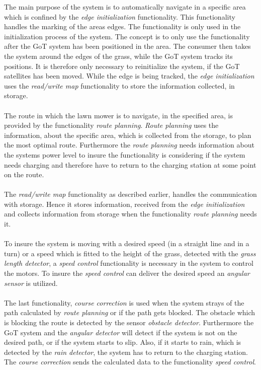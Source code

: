 \noindent
The main purpose of the system is to automatically navigate in a specific area which is confined by the \textit{edge initialization} functionality. This functionality handles the marking of the areas edges. The functionality is only used in the initialization process of the system. The concept is to only use the functionality after the GoT system has been positioned in the area. The consumer then takes the system around the edges of the grass, while the GoT system tracks its positions. It is therefore only necessary to reinitialize the system, if the GoT satellites has been moved. While the edge is being tracked, the \textit{edge initialization} uses the \textit{read/write map} functionality to store the information collected, in storage. \\\\ 
\noindent
The route in which the lawn mower is to navigate, in the specified area, is provided by the functionality \textit{route planning}. \textit{Route planning} uses the information, about the specific area, which is collected from the storage, to plan the most optimal route. Furthermore the \textit{route planning} needs information about the systems power level to insure the functionality is considering if the system needs charging and therefore have to return to the charging station at some point on the route.\\\\
\noindent
The \textit{read/write map} functionality as described earlier, handles the communication with storage. Hence it stores information, received from the \textit{edge initialization} and collects information from storage when the functionality \textit{route planning} needs it. \\\\
\noindent
To insure the system is moving with a desired speed (in a straight line and in a turn) or a speed which is fitted to the height of the grass, detected with the \textit{grass length detector}, a \textit{speed control} functionality is necessary in the system to control the motors. To insure the \textit{speed control} can deliver the desired speed an \textit{angular sensor} is utilized. \\\\
\noindent
The last functionality, \textit{course correction} is used when the system strays of the path calculated by \textit{route planning} or if the path gets blocked.
The obstacle which is blocking the route is detected by the sensor \textit{obstacle detector}. Furthermore the GoT system and the \textit{angular detector} will detect if the system is not on the desired path, or if the system starts to slip. Also, if it starts to rain, which is detected by the \textit{rain detector}, the system has to return to the charging station.
The \textit{course correction} sends the calculated data to the functionality \textit{speed control}. %